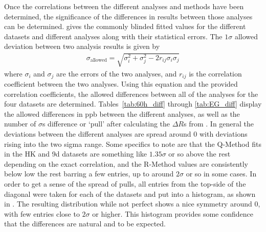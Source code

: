 Once the correlations between the different analyses and methods have been determined, the significance of the differences in results between those analyses can be determined.  gives the commonly blinded fitted \R values for the different datasets and different analyses along with their statistical errors. The $1\sigma$ allowed deviation between two analysis results is given by
\begin{align}
	\sigma_{\text{allowed}} = \sqrt{\sigma^{2}_{i} + \sigma^{2}_{j} - 2r_{ij}\sigma_{i}\sigma_{j}}
\end{align}
where $\sigma_{i}$ and $\sigma_{j}$ are the errors of the two analyses, and $r_{ij}$ is the correlation coefficient between the two analyses. Using this equation and the provided correlation coefficients, the allowed differences between all of the analyses for the four datasets are determined. Tables~\ref{tab:60h_diff} through \ref{tab:EG_diff} display the allowed differences in ppb between the different analyses, as well as the number of $\sigma$s difference or `pull' after calculating the $\Delta R$s from .  In general the deviations between the different analyses are spread around 0 with deviations rising into the two sigma range. Some specifics to note are that the Q-Method fits in the HK and 9d datasets are something like $1.35\sigma$ or so above the rest depending on the exact correlation, and the R-Method values are consistently below low the rest barring a few entries, up to around $2\sigma$ or so in some cases. In order to get a sense of the spread of pulls, all entries from the top-side of the diagonal were taken for each of the datasets and put into a histogram, as shown in . The resulting distribution while not perfect shows a nice symmetry around 0, with few entries close to $2\sigma$ or higher. This histogram provides some confidence that the differences are natural and to be expected.







